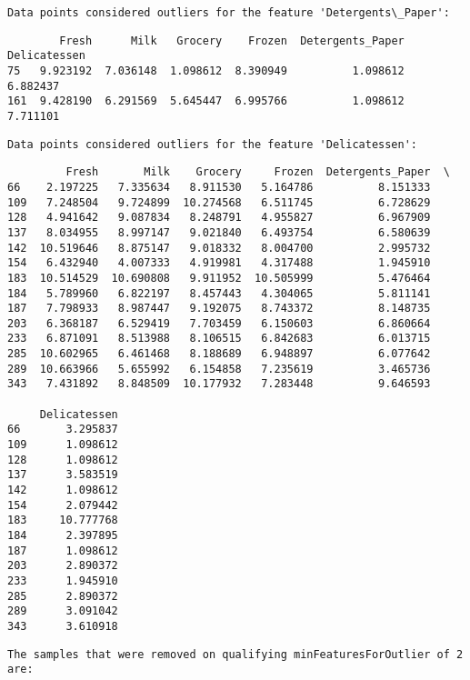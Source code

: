 \documentclass{article}
\begin{document}
    
    \begin{Verbatim}[commandchars=\\\{\}]
Data points considered outliers for the feature 'Detergents\_Paper':
    \end{Verbatim}

    
    \begin{verbatim}
        Fresh      Milk   Grocery    Frozen  Detergents_Paper  Delicatessen
75   9.923192  7.036148  1.098612  8.390949          1.098612      6.882437
161  9.428190  6.291569  5.645447  6.995766          1.098612      7.711101
    \end{verbatim}

    
    \begin{Verbatim}[commandchars=\\\{\}]
Data points considered outliers for the feature 'Delicatessen':
    \end{Verbatim}

    
    \begin{verbatim}
         Fresh       Milk    Grocery     Frozen  Detergents_Paper  \
66    2.197225   7.335634   8.911530   5.164786          8.151333   
109   7.248504   9.724899  10.274568   6.511745          6.728629   
128   4.941642   9.087834   8.248791   4.955827          6.967909   
137   8.034955   8.997147   9.021840   6.493754          6.580639   
142  10.519646   8.875147   9.018332   8.004700          2.995732   
154   6.432940   4.007333   4.919981   4.317488          1.945910   
183  10.514529  10.690808   9.911952  10.505999          5.476464   
184   5.789960   6.822197   8.457443   4.304065          5.811141   
187   7.798933   8.987447   9.192075   8.743372          8.148735   
203   6.368187   6.529419   7.703459   6.150603          6.860664   
233   6.871091   8.513988   8.106515   6.842683          6.013715   
285  10.602965   6.461468   8.188689   6.948897          6.077642   
289  10.663966   5.655992   6.154858   7.235619          3.465736   
343   7.431892   8.848509  10.177932   7.283448          9.646593   

     Delicatessen  
66       3.295837  
109      1.098612  
128      1.098612  
137      3.583519  
142      1.098612  
154      2.079442  
183     10.777768  
184      2.397895  
187      1.098612  
203      2.890372  
233      1.945910  
285      2.890372  
289      3.091042  
343      3.610918  
    \end{verbatim}

    
    \begin{Verbatim}[commandchars=\\\{\}]
The samples that were removed on qualifying minFeaturesForOutlier of 2 are:
    \end{Verbatim}
\end{document}
